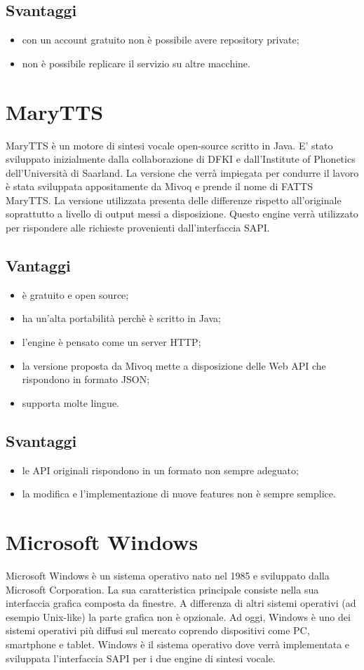 \subsection*{Svantaggi}
\begin{itemize}
	\item con un account gratuito non è possibile avere repository private;
	\item non è possibile replicare il servizio su altre macchine.
\end{itemize}
\section{MaryTTS}
MaryTTS è un motore di sintesi vocale open-source scritto in Java. E' stato sviluppato inizialmente dalla collaborazione di DFKI e dall'Institute of Phonetics dell'Università di Saarland. La versione che verrà impiegata per condurre il lavoro è stata sviluppata appositamente da Mivoq e prende il nome di FATTS MaryTTS. La versione utilizzata presenta delle differenze rispetto all'originale soprattutto a livello di output messi a disposizione.
Questo engine verrà utilizzato per rispondere alle richieste provenienti dall'interfaccia SAPI.
\subsection*{Vantaggi}
\begin{itemize}
	\item è gratuito e open source;
	\item ha un'alta portabilità perchè è scritto in Java;
	\item l'engine è pensato come un server HTTP;
	\item la versione proposta da Mivoq mette a disposizione delle Web API che rispondono in formato JSON;
	\item supporta molte lingue.
\end{itemize}
\subsection*{Svantaggi}
\begin{itemize}
	\item le API originali rispondono in un formato non sempre adeguato;
	\item la modifica e l'implementazione di nuove features non è sempre semplice.
\end{itemize}
\section{Microsoft Windows}
Microsoft Windows è un sistema operativo nato nel 1985 e sviluppato dalla Microsoft Corporation. La sua caratteristica principale consiste nella sua interfaccia grafica composta da finestre. A differenza di altri sistemi operativi (ad esempio Unix-like) la parte grafica non è opzionale. Ad oggi, Windows è uno dei sistemi operativi più diffusi sul mercato coprendo dispositivi come PC, smartphone e tablet. 
Windows è il sistema operativo dove verrà implementata e sviluppata l'interfaccia SAPI per i due engine di sintesi vocale.

